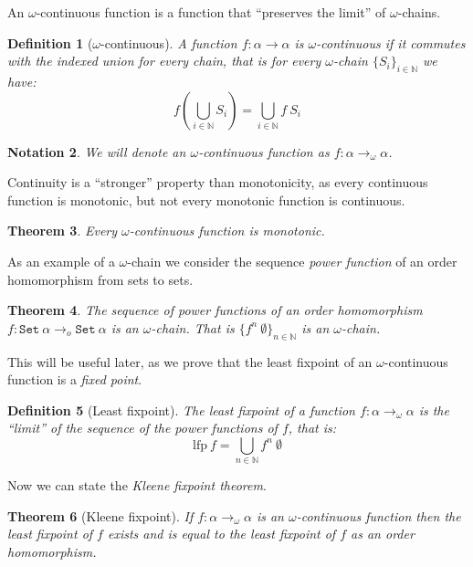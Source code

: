\documentclass[
  a4paper, 
  10pt, 
  parskip=half, 
  DIV=20,
  toc=bibliography,
  usegeometry,
]{scrartcl}
\newtheorem{theorem}{Theorem}[section]
\newtheorem{definition}[theorem]{Definition}
\newtheorem{notation}[theorem]{Notation}
\newcommand{\funfont}[1]{\text{#1}}
\newcommand{\tyfont}[1]{\texttt{#1}}
\begin{document}
An \(\omega\)-continuous function is a function that \enquote{preserves the limit} of
\(\omega\)-chains.

\begin{definition}[\(\omega\)-continuous]
  A function \(f: \alpha \to \alpha\) is \(\omega\)-continuous if it commutes with the
  indexed union for every chain, that is for every \(\omega\)-chain 
  \(\{S_i\}_{i \in \mathbb{N}}\) we have:
  \[
    f \left( \bigcup_{i \in \mathbb{N}} S_i \right) = \bigcup_{i \in \mathbb{N}} f \ S_i
  \]
\end{definition}

\begin{notation}
  We will denote an \(\omega\)-continuous function as \(f: \alpha \to_\omega \alpha\).
\end{notation}

Continuity is a \enquote{stronger} property than monotonicity, as every continuous
function is monotonic, but not every monotonic function is continuous.

\begin{theorem}
  Every \(\omega\)-continuous function is monotonic.
\end{theorem}

As an example of a \(\omega\)-chain we consider the sequence \emph{power function} of
an order homomorphism from sets to sets.

\begin{theorem}\label{thm:fpow_chain}
  The sequence of power functions of an order homomorphism \(f: \tyfont{Set} \ \alpha \to_o \tyfont{Set} \ \alpha\)
   is an \(\omega\)-chain. That is \(\{f^n \ \emptyset\}_{n \in \mathbb{N}}\) is an \(\omega\)-chain.
\end{theorem}

This will be useful later, as we prove that the least fixpoint of an \(\omega\)-continuous
function is a \emph{fixed point}.

\begin{definition}[Least fixpoint]
  The least fixpoint of a function \(f: \alpha \to_\omega \alpha\) is the 
  \enquote{limit} of the sequence of the power functions of \(f\), that is:
  \[
    \funfont{lfp} \ f = \bigcup_{n \in \mathbb{N}} f^n \ \emptyset
  \]
\end{definition}

Now we can state the \emph{Kleene fixpoint theorem}.

\begin{theorem}[Kleene fixpoint]
  If \(f: \alpha \to_\omega \alpha\) is an \(\omega\)-continuous function
  then the least fixpoint of \(f\) exists and is equal to the least fixpoint
  of \(f\) as an order homomorphism.
\end{theorem}
\end{document}
